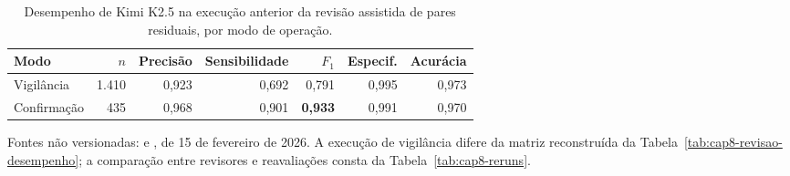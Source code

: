 \begin{table}[htbp]
\centering
\caption{Desempenho de Kimi K2.5 na execução anterior da revisão assistida de pares residuais, por modo de operação.}
\label{tab:qw2-llm-comparison}
\small
\begin{tabular}{lrrrrrr}
\toprule
Modo & $n$ & Precis\~ao & Sensibilidade & $F_1$ & Especif. & Acur\'acia \\
\midrule
Vigil\^ancia   & 1.410 & 0,923 & 0,692 & 0,791 & 0,995 & 0,973 \\
Confirma\c{c}\~ao & 435   & 0,968 & 0,901 & \textbf{0,933} & 0,991 & 0,970 \\
\bottomrule
\end{tabular}
\par\smallskip
\parbox{\linewidth}{\footnotesize Fontes não versionadas:  e , de 15 de fevereiro de 2026. A execução de vigilância difere da matriz reconstruída da Tabela~\ref{tab:cap8-revisao-desempenho}; a comparação entre revisores e reavaliações consta da Tabela~\ref{tab:cap8-reruns}.}
\end{table}
